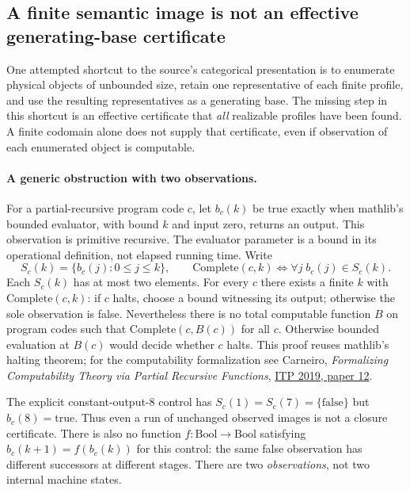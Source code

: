 \subsection{A finite semantic image is not an effective generating-base certificate}
\label{sec:finite-image-base-audit}

One attempted shortcut to the source's categorical presentation is to
enumerate physical objects of unbounded size, retain one representative of
each finite profile, and use the resulting representatives as a generating
base. The missing step in this shortcut is an effective
certificate that \emph{all} realizable profiles have been found. A finite
codomain alone does not supply that certificate, even if observation of each
enumerated object is computable.

\paragraph{A generic obstruction with two observations.}
For a partial-recursive program code $c$, let $b_c(k)$ be true exactly when
mathlib's bounded evaluator, with bound $k$ and input zero, returns an
output. This observation is primitive recursive. The evaluator parameter
is a bound in its operational definition, not elapsed running time.
Write
\[
 S_c(k)=\{b_c(j):0\le j\le k\},\qquad
 \mathrm{Complete}(c,k)\iff
       \forall j\; b_c(j)\in S_c(k).
\]
Each $S_c(k)$ has at most two elements. For every $c$ there exists a finite
$k$ with $\mathrm{Complete}(c,k)$: if $c$ halts, choose a bound witnessing
its output; otherwise the sole observation is false.
Nevertheless there is no total computable function $B$ on program codes
such that $\mathrm{Complete}(c,B(c))$ for all $c$.
Otherwise bounded evaluation at $B(c)$ would decide whether $c$ halts.
This proof reuses mathlib's halting theorem; for the computability
formalization see Carneiro, \emph{Formalizing Computability Theory via
Partial Recursive Functions},
\href{https://doi.org/10.4230/LIPIcs.ITP.2019.12}{ITP 2019, paper 12}.

The explicit constant-output-$8$ control has
$S_c(1)=S_c(7)=\{\mathrm{false}\}$ but $b_c(8)=\mathrm{true}$.
Thus even a run of unchanged observed images is not a closure certificate.
There is also no function $f:\mathrm{Bool}\to\mathrm{Bool}$ satisfying
$b_c(k+1)=f(b_c(k))$ for this control: the same false observation has
different successors at different stages.
There are two \emph{observations}, not two internal machine states.

